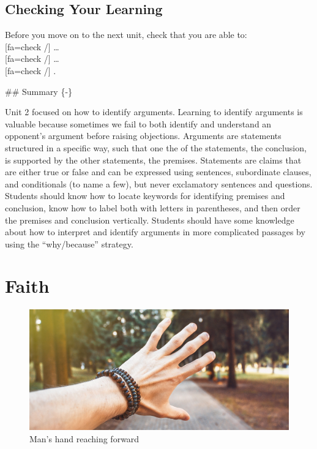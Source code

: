 \documentclass[
]{book}
\begin{document}
\hypertarget{checking-your-learning-1}{%
\section*{Checking Your Learning}\label{checking-your-learning-1}}

\begin{progress}
Before you move on to the next unit, check that you are able to:\\
{[}fa=check /{]} \ldots{}\\
{[}fa=check /{]} \ldots{}\\
{[}fa=check /{]} .
\end{progress}
\#\# Summary \{-\}

Unit 2 focused on how to identify arguments. Learning to identify arguments is valuable because sometimes we fail to both identify and understand an opponent's argument before raising objections. Arguments are statements structured in a specific way, such that one the of the statements, the conclusion, is supported by the other statements, the premises. Statements are claims that are either true or false and can be expressed using sentences, subordinate clauses, and conditionals (to name a few), but never exclamatory sentences and questions. Students should know how to locate keywords for identifying premises and conclusion, know how to label both with letters in parentheses, and then order the premises and conclusion vertically. Students should have some knowledge about how to interpret and identify arguments in more complicated passages by using the ``why/because'' strategy.

\hypertarget{faith}{%
\chapter{Faith}\label{faith}}

\begin{figure}
\centering
\includegraphics{assets/u3/Unit3Overview.jpg}
\caption{Man's hand reaching forward}
\end{figure}
\end{document}
